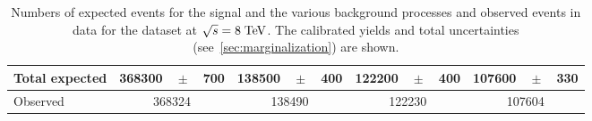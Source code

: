 \begin{table}
\begin{tabular}{ l  rrr  rrr  rrr  rrr }
    Total expected              & 368300 &$\!\!\!\pm\!\!\!$& 700    & 138500 &$\!\!\!\pm\!\!\!$& 400  & 122200 &$\!\!\!\pm\!\!\!$& 400 & 107600 &$\!\!\!\pm\!\!\!$& 330 \\
    \midrule                                                                                                                                                            
    Observed                    & \multicolumn{3}{c}{368324}        & \multicolumn{3}{c}{138490}      & \multicolumn{3}{c}{122230}     & \multicolumn{3}{c}{107604}     \\
    \bottomrule
  \end{tabular}
  \caption{
    Numbers of expected events for the \ttbar{} signal and the various background 
    processes and observed events in data for the \mujets{} dataset
    at $\sqrt{s} = 8 \; \mathrm{TeV}{}$.
    The calibrated yields and total uncertainties (see~\ref{sec:marginalization}) are shown.}
  \label{tab:yields2012mu}
\end{table}

